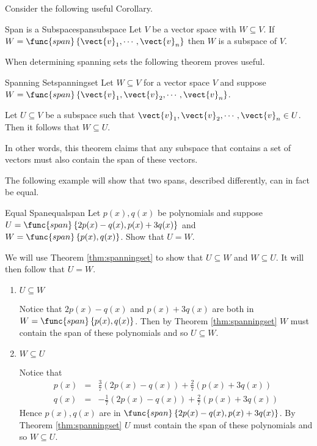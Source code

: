 Consider the following useful Corollary.

\begin{corollary}{Span is a Subspace}{spansubspace}
Let $V$ be a vector space with $W \subseteq V$. If $W = \func{span} \left\{ \vect{v}_1, \cdots,  \vect{v}_n \right\}$ then $W$ is a subspace of $V$.
\end{corollary}

When determining spanning sets the following theorem proves useful.

\begin{theorem}{Spanning Set}{spanningset}
Let $W \subseteq V$ for a vector space $V$ and suppose $W = \func{span} \left\{ \vect{v}_1, \vect{v}_2, \cdots, \vect{v}_n \right\}$. 

Let $U \subseteq V$ be a subspace such that $\vect{v}_1, \vect{v}_2, \cdots, \vect{v}_n \in U$. Then it follows that $W \subseteq U$. 
\end{theorem}

In other words, this theorem claims that any subspace that contains a set of vectors must also contain the span of these vectors. 

The following example will show that two spans, described differently, can in fact be equal. 

\begin{example}{Equal Span}{equalspan}
Let $p(x), q(x)$ be polynomials and suppose $U = \func{span}\left\{ 2p(x) - q(x), p(x) + 3q(x)\right\} $ and $W =  \func{span}\left\{ p(x), q(x) \right\}$. Show that $U = W$. 
\end{example}

\begin{solution}
We will use Theorem \ref{thm:spanningset} to show that $U \subseteq W$ and $W \subseteq U$. It will then follow that $U=W$. 
\begin{enumerate}
\item $U \subseteq W$

Notice that $2p(x) - q(x)$ and $p(x) + 3q(x)$  are both in $W = \func{span} \left\{ p(x), q(x) \right\}$. Then by Theorem \ref{thm:spanningset} $W$ must contain the span of these polynomials and so $U \subseteq W$. 

\item $W \subseteq U$

Notice that 
\begin{eqnarray*}
p(x) &=& \frac{3}{7} \left( 2p(x) - q(x) \right)  + \frac{2}{7} \left( p(x) + 3q(x)\right) \\
q(x) &=& -\frac{1}{7} \left( 2p(x) - q(x) \right)  + \frac{2}{7} \left( p(x) + 3q(x)\right)
\end{eqnarray*}
Hence $p(x), q(x)$ are in $\func{span} \left\{ 2p(x) - q(x), p(x) + 3q(x) \right\}$. By Theorem \ref{thm:spanningset} $U$ must contain the span of these polynomials and so $W \subseteq U$. 
\end{enumerate}
\end{solution}

